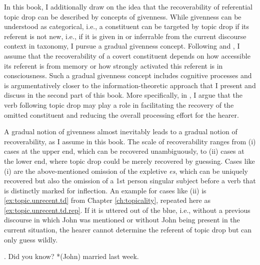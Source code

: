 In this book, I additionally draw on the idea that the recoverability of referential topic drop can be described by concepts of givenness.
While givenness can be understood as categorical, i.e., a constituent can be targeted by topic drop if its referent is not new, i.e., if it is given  in or inferrable from the current discourse context in  taxonomy, I pursue a gradual givenness concept.
Following \citet{chafe1994} and \citet{ariel1990}, I assume that the recoverability of a covert constituent depends on how accessible its referent is from memory or how strongly activated this referent is in consciousness.
Such a gradual givenness concept includes cognitive processes and is argumentatively closer to the information-theoretic  approach that I present and discuss in the second part of this book.
More specifically, in , I argue that the verb following topic drop may play a role in facilitating the recovery of the omitted constituent and reducing the overall processing effort  for the hearer.

A gradual notion of givenness almost inevitably leads to a gradual notion of recoverability, as I assume in this book.
The scale of recoverability ranges from (i) cases at the upper end, which can be recovered unambiguously, to (ii) cases at the lower end, where topic drop could be merely recovered by guessing.
Cases like (i) are the above-mentioned omission of the expletive  \textit{es}, which can be uniquely recovered but also the omission of a 1st person singular subject before a verb that is distinctly marked for inflection. 
An example for cases like (ii) is \ref{ex:topic.unrecent.td} from Chapter \ref{ch:topicality}, repeated here as \ref{ex:topic.unrecent.td.rep}.
If it is uttered out of the blue, i.e., without a previous discourse in which John was mentioned or without John being present in the current situation, the hearer cannot determine the referent of topic drop but can only guess wildly.

\ex.\label{ex:topic.unrecent.td.rep}  Did you know? *(John) married last week.

